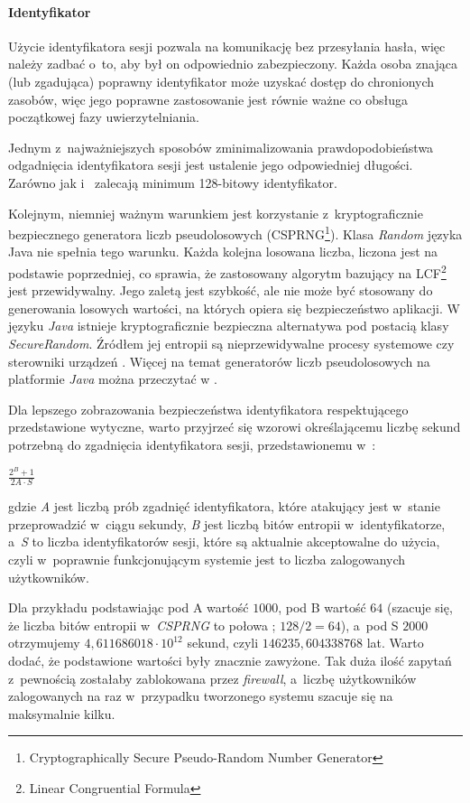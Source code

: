 \documentclass[11pt]{aghdpl}
\begin{document}
\paragraph{Identyfikator}
\label{sec:identyfikator}

Użycie identyfikatora sesji pozwala na komunikację bez przesyłania hasła, więc należy zadbać o~to, aby był on odpowiednio zabezpieczony. Każda osoba znająca (lub zgadująca) poprawny identyfikator może uzyskać dostęp do chronionych zasobów, więc jego poprawne zastosowanie jest równie ważne co obsługa początkowej fazy uwierzytelniania.

Jednym z~najważniejszych sposobów zminimalizowania prawdopodobieństwa odgadnięcia identyfikatora sesji jest ustalenie jego odpowiedniej długości. Zarówno \cite{SId} jak i~\cite{SeMa08} zalecają minimum 128-bitowy identyfikator.

Kolejnym, niemniej ważnym warunkiem jest korzystanie z~kryptograficznie bezpiecznego generatora liczb pseudolosowych (CSPRNG\footnote{Cryptographically Secure Pseudo-Random Number Generator}). Klasa \emph{Random} języka Java nie spełnia tego warunku. Każda kolejna losowana liczba, liczona jest na podstawie poprzedniej, co sprawia, że zastosowany algorytm bazujący na LCF\footnote{Linear Congruential Formula} jest przewidywalny. Jego zaletą jest szybkość, ale nie może być stosowany do generowania losowych wartości, na których opiera się bezpieczeństwo aplikacji. W języku \emph{Java} istnieje kryptograficznie bezpieczna alternatywa pod postacią klasy \emph{SecureRandom}. Źródłem jej entropii są nieprzewidywalne procesy systemowe czy sterowniki urządzeń \cite{RND}. Więcej na temat generatorów liczb pseudolosowych na platformie \emph{Java} można przeczytać w \cite{SRNGiJ}.

Dla lepszego zobrazowania bezpieczeństwa identyfikatora respektującego przedstawione wytyczne, warto przyjrzeć się wzorowi określającemu liczbę sekund potrzebną do zgadnięcia identyfikatora sesji, przedstawionemu w~\cite{SId}:

$\frac{2^{B} + 1}{2A \cdot S}$

gdzie \emph{A} jest liczbą prób zgadnięć identyfikatora, które atakujący jest w~stanie przeprowadzić w~ciągu sekundy, \emph{B} jest liczbą bitów entropii w~identyfikatorze, a~\emph{S} to liczba identyfikatorów sesji, które są aktualnie akceptowalne do użycia, czyli w~poprawnie funkcjonującym systemie jest to liczba zalogowanych użytkowników.

Dla przykładu podstawiając pod A wartość $1000$, pod B wartość $64$ (szacuje się, że liczba bitów entropii w~\emph{CSPRNG} to połowa \cite{SId,SMC}; $128/2=64$), a~pod S $2000$ otrzymujemy $4,611686018\cdot10^{12}$ sekund, czyli $146235,604338768$ lat. Warto dodać, że podstawione wartości były znacznie zawyżone. Tak duża ilość zapytań z~pewnością zostałaby zablokowana przez \emph{firewall}, a~liczbę użytkowników zalogowanych na raz w~przypadku tworzonego systemu szacuje się na maksymalnie kilku.
\end{document}
